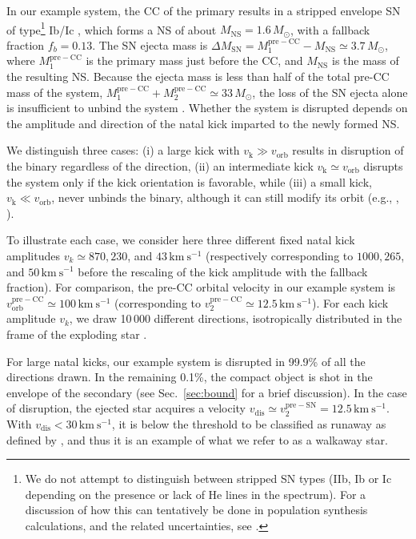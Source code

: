\documentclass{aa}
\DeclareRobustCommand{\Secref}[1]{Sec.~\ref{#1}}
\begin{document}
In our example system, the CC of
the primary results in a stripped envelope SN of type\footnote{We do not attempt to distinguish between stripped SN types (IIb, Ib or Ic depending on
the presence or lack of He lines in the spectrum). For a discussion of
how this can tentatively be done in population synthesis calculations,
and the related uncertainties, see \cite{zapartas:17b}.} Ib/Ic 
\citep[][]{filippenko:97}, which forms a NS of about
$M_\mathrm{NS}=1.6\,M_\odot$, with a fallback fraction $f_b=0.13$. The SN ejecta mass is $\Delta M_\mathrm{SN} = M_1^\mathrm{pre-CC}-M_\mathrm{NS}
\simeq 3.7\,M_\odot$, where $M_1^\mathrm{pre-CC}$ is the primary mass just
before the CC, and $M_\mathrm{NS}$ is the mass of the resulting
NS. Because the ejecta mass is less than half of the total pre-CC mass
of the system, $M_1^\mathrm{pre-CC}+M_2^\mathrm{pre-CC}\simeq33\,M_\odot$,
the loss of the SN ejecta alone is insufficient to
unbind the system \citep[][]{blaauw:61}. Whether the system is
disrupted depends on the amplitude and direction of the natal kick
imparted to the newly formed NS.


We distinguish three cases: (i) a large kick with $v_\mathrm{k}\gg v_\mathrm{orb}$ results in disruption of the binary regardless of the
direction, (ii) an intermediate kick $v_\mathrm{k} \simeq v_\mathrm{orb}$ disrupts the system only if the kick
orientation is favorable, while (iii) a small kick, $v_\mathrm{k}
\ll v_\mathrm{orb}$, never unbinds the binary, although it
can still modify its orbit (e.g., \citealt{brandt:95, kalogera:96}, ).

To illustrate each case, we consider here three different fixed natal kick
amplitudes $v_k\simeq 870, 230$, and $43\,\mathrm{km\ s^{-1}}$ (respectively
corresponding to $1000,265$, and $50\,\mathrm{km \ s^{-1}}$ before the
rescaling of the kick amplitude with the fallback fraction). For comparison, the pre-CC orbital
velocity in our example system is $v_\mathrm{orb}^\mathrm{pre-CC}\simeq
100\,\mathrm{km\ s^{-1}}$ (corresponding to
$v_2^\mathrm{pre-CC}\simeq12.5\,\mathrm{km\ s^{-1}}$). For each kick amplitude $v_k$, we draw 10\,000 different directions,
isotropically distributed in the frame of the exploding star \citep[e.g.,][]{wongwathanarat:13}.


For large natal kicks, our example system is disrupted in 99.9\% of
all the directions drawn. In the remaining 0.1\%, the
compact object is shot in the envelope of the secondary (see
\Secref{sec:bound} for a brief discussion).
In the case of disruption, the ejected star acquires a velocity
$v_\mathrm{dis}\simeq v_2^\mathrm{pre-SN}=12.5\,\mathrm{km\
  s^{-1}}$. With $v_\mathrm{dis} < 30\,\mathrm{km\
  s^{-1}}$, it is below the threshold to
be classified as runaway as defined by \cite{blaauw:56,
  hoogerwerf:00, hoogerwerf:01}, and thus it is
an example of what we refer to as a walkaway star.
\end{document}
